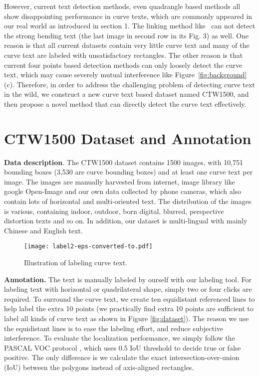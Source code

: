 \documentclass[10pt,twocolumn,letterpaper]{article}
\begin{document}
However, current text detection methods, even quadrangle based methods all show disappointing performance in curve texts, which are commonly appeared in our real world as introduced in section 1. The linking method like~\cite{shi2017detecting} can not detect the strong bending text (the last image in second row in its Fig. 3) as well. One reason is that all current datasets contain very little curve text and many of the curve text are labeled with unsatisfactory rectangles. The other reason is that current four points based detection methods can only loosely detect the curve text, which may cause severely mutual interference like Figure~\ref{fig:background} (c). Therefore, in order to address the challenging problem of detecting curve text in the wild, we construct a new curve text based dataset named CTW1500, and then propose a novel method that can directly detect the curve text effectively.


\section{CTW1500 Dataset and Annotation}

{\bf{Data description}}. The CTW1500 dataset contains 1500 images, with 10,751 bounding boxes (3,530 are curve bounding boxes) and at least one curve text per image. The images are manually harvested from internet, image library like google Open-Image \cite{openimages} and our own data collected by phone cameras, which also contain lots of horizontal and multi-oriented text. The distribution of the images is various, containing indoor, outdoor, born digital, blurred, perspective distortion texts and so on. In addition, our dataset is multi-lingual with mainly Chinese and English text.
\begin{figure}[htb]
  \centering
  \centerline{\texttt{[image: label2-eps-converted-to.pdf]}}
  \caption{Illustration of labeling curve text.}\label{fig:label}
\end{figure}

{\bf{Annotation}.} The text is manually labeled by ourself with our labeling tool. For labeling text with horizontal or quadrilateral shape, simply two or four clicks are required. To surround the curve text, we create ten equidistant referenced lines to help label the extra 10 points (we practically find extra 10 points are sufficient to label all kinds of curve text as shown in Figure \ref{fig:dataset}). The reason we use the equidistant lines is to ease the labeling effort, and reduce subjective interference.
To evaluate the localization performance, we simply follow the PASCAL VOC protocol \cite{everingham2010pascal}, which uses 0.5 IoU threshold to decide true or false positive. The only difference is we calculate the exact intersection-over-union (IoU) between the polygons instead of axis-aligned rectangles.
\end{document}
